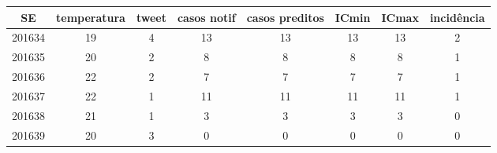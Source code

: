 \begin{tabular}{c|ccccccc}
  \hline
SE & temperatura & tweet & casos notif & casos preditos & ICmin & ICmax & incidência \\ 
  \hline
201634 & 19 & 4 & 13 & 13 & 13 & 13 & 2 \\ 
  201635 & 20 & 2 & 8 & 8 & 8 & 8 & 1 \\ 
  201636 & 22 & 2 & 7 & 7 & 7 & 7 & 1 \\ 
  201637 & 22 & 1 & 11 & 11 & 11 & 11 & 1 \\ 
  201638 & 21 & 1 & 3 & 3 & 3 & 3 & 0 \\ 
  201639 & 20 & 3 & 0 & 0 & 0 & 0 & 0 \\ 
   \hline
\end{tabular}
